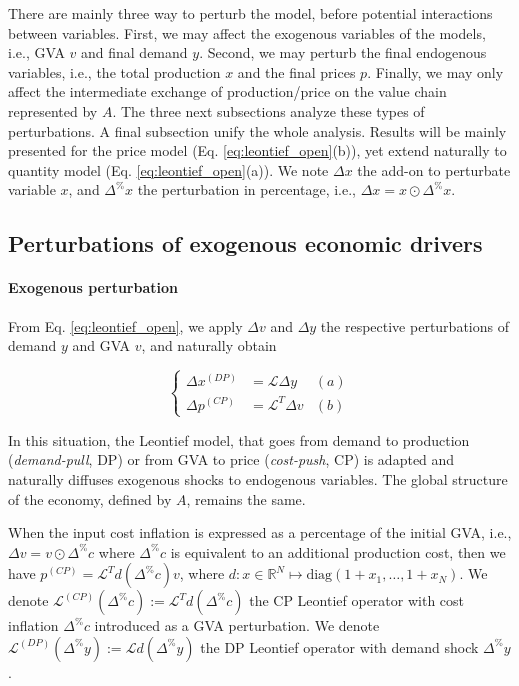 \documentclass{article}
\begin{document}
\vspace{0.1cm}

There are mainly three way to perturb the model, before potential interactions between variables. First, we may affect the exogenous variables of the models, i.e., GVA $v$ and final demand $y$. Second, we may perturb the final endogenous variables, i.e., the total production $x$ and the final prices $p$. Finally, we may only affect the intermediate exchange of production/price on the value chain represented by $A$. The three next subsections analyze these types of perturbations. A final subsection unify the whole analysis. Results will be mainly presented for the price model (Eq. \eqref{eq:leontief_open}(b)), yet extend naturally to quantity model (Eq. \eqref{eq:leontief_open}(a)). We note $\Delta x$ the add-on to perturbate variable $x$, and $\Delta^{\%} x$ the perturbation in percentage, i.e., $\Delta x = x \odot \Delta^{\%} x$. 

\subsection{Perturbations of exogenous economic drivers}
\label{sec:exogenous_perturbations}

\paragraph{Exogenous perturbation} From Eq. \eqref{eq:leontief_open}, we apply $\Delta v$ and $\Delta y$ the respective perturbations of demand $y$ and GVA $v$, and naturally obtain

\begin{equation}
\label{eq:perturbed_exogenous_leontief}
    \left\{\begin{aligned}
     \Delta x^{(DP)} & = \mathcal{L} \Delta y & (a) \\
     \Delta p^{(CP)} & = \mathcal{L}^T \Delta v & (b)
    \end{aligned}\right.
\end{equation}

\noindent In this situation, the Leontief model, that goes from demand to production (\textit{demand-pull}, DP) or from GVA to price (\textit{cost-push}, CP) is adapted and naturally diffuses exogenous shocks to endogenous variables. The global structure of the economy, defined by $A$, remains the same. 

\vspace{0.1cm}

When the input cost inflation is expressed as a percentage of the initial GVA, i.e., $\Delta v=v \odot \Delta^\% c$ where $\Delta^\% c$ is equivalent to an additional production cost, then we have $p^{(CP)} = \mathcal{L}^T d(\Delta^\% c)v $, where $d:x \in \mathbb{R}^N \mapsto \text{diag} \left( {1 + x_1}, \dots, {1 + x_N} \right)$. We denote $\mathcal{L}^{(CP)}(\Delta^\% c):=\mathcal{L}^T d(\Delta^\% c)$ the CP Leontief operator with cost inflation $\Delta^\% c$ introduced as a GVA perturbation. We denote $\mathcal{L}^{(DP)}(\Delta^\% y):=\mathcal{L} d(\Delta^\% y)$ the DP Leontief operator with demand shock $\Delta^\% y$. 
\end{document}
